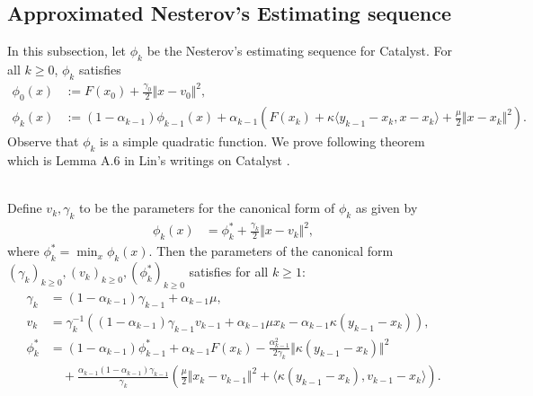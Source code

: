 \documentclass[12pt]{article}
\begin{document}
    \subsection{Approximated Nesterov's Estimating sequence}\label{app:sec:appx-nes-est-seq}
        In this subsection, let $\phi_k$ be the Nesterov's estimating sequence for Catalyst. 
        For all $k \ge0$, $\phi_k$ satisfies 
        \begin{align*}
            \phi_0(x) &:= F(x_0) + \frac{\gamma_0}{2}\Vert x - v_0\Vert^2, 
            \\
            \phi_k(x) &:= 
            (1 - \alpha_{k - 1})\phi_{k - 1}(x) + 
            \alpha_{k - 1}\left(
                F(x_k) + \kappa\langle y_{k - 1} - x_k, x - x_k\rangle
                + \frac{\mu}{2} \Vert x - x_k\Vert^2
            \right). 
        \end{align*}
        Observe that $\phi_k$ is a simple quadratic function. 
        We prove following theorem which is Lemma A.6 in Lin's writings on Catalyst \cite{lin_universal_2015}. 
        \begin{theorem}\;\\
            Define $v_k, \gamma_k$ to be the parameters for the canonical form of $\phi_k$ as given by 
            \begin{align*}
                \phi_k(x) &= \phi_k^* + \frac{\gamma_k}{2}\Vert x - v_k\Vert^2, 
            \end{align*}
            where $\phi_k^* = \min_x \phi_k(x)$. 
            Then the parameters of the canonical form $(\gamma_{k})_{k \ge0}, (v_k)_{k \ge 0}, (\phi_k^*)_{k\ge 0}$ satisfies for all $k \ge 1$: 
            \begin{align*}
                \gamma_k &= (1 - \alpha_{k - 1})\gamma_{k - 1} + \alpha_{k - 1}\mu, 
                \\
                v_k &= 
                \gamma_k^{-1}(
                    (1 - \alpha_{k - 1})\gamma_{k - 1}v_{k - 1}
                    + \alpha_{k - 1}\mu x_k - \alpha_{k - 1}\kappa(y_{k - 1} - x_k)
                ), 
                \\
                \phi_k^* &= (1 - \alpha_{k - 1})\phi_{k - 1}^*
                + \alpha_{k - 1}F(x_k)
                - \frac{\alpha_{k - 1}^2}{2\gamma_k}\Vert \kappa(y_{k - 1} - x_k)\Vert^2
                \\
                &\quad 
                + \frac{\alpha_{k - 1}(1 - \alpha_{k - 1})\gamma_{k - 1}}{\gamma_k}
                \left(
                    \frac{\mu}{2}\Vert x_k - v_{k - 1}\Vert^2 + 
                    \langle \kappa(y_{k - 1} - x_k), v_{k - 1} - x_k\rangle
                \right). 
            \end{align*}
        \end{theorem}
\end{document}
